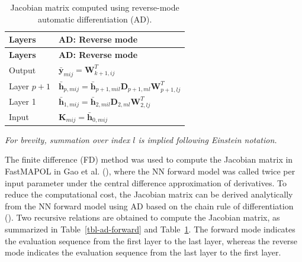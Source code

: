 \documentclass[
  11pt,
  letterpaper,
]{scrreprt}
\begin{document}
\begin{longtable}[]{@{}
  >{\raggedright\arraybackslash}p{}
  >{\raggedright\arraybackslash}p{}@{}}
\caption{Jacobian matrix computed using reverse-mode automatic
differentiation (AD).}\label{tbl-ad-reverse}\tabularnewline
\toprule\noalign{}
\begin{minipage}[b]{\linewidth}\raggedright
\textbf{Layers}
\end{minipage} & \begin{minipage}[b]{\linewidth}\raggedright
\textbf{AD: Reverse mode}
\end{minipage} \\
\midrule\noalign{}
\endfirsthead
\toprule\noalign{}
\begin{minipage}[b]{\linewidth}\raggedright
\textbf{Layers}
\end{minipage} & \begin{minipage}[b]{\linewidth}\raggedright
\textbf{AD: Reverse mode}
\end{minipage} \\
\midrule\noalign{}
\endhead
\bottomrule\noalign{}
\endlastfoot
Output & \(\bar{\mathbf{y}}_{mij}=\mathbf{W}_{k+1,ij}^T\) \\
Layer \(p+1\) &
\(\bar{\mathbf{h}}_{p,mij}=\bar{\mathbf{h}}_{p+1,mil}\mathbf{D}_{p+1,ml}\mathbf{W}_{p+1,lj}^T\) \\
Layer 1 &
\(\bar{\mathbf{h}}_{1,mij}=\bar{\mathbf{h}}_{2,mil}\mathbf{D}_{2,ml}\mathbf{W}_{2,lj}^T\) \\
Input & \(\mathbf{K}_{mij}=\bar{\mathbf{h}}_{0,mij}\) \\
\end{longtable}

\emph{For brevity, summation over index \(l\) is implied following
Einstein notation.}

The finite difference (FD) method was used to compute the Jacobian
matrix in FastMAPOL in Gao et al. (),
where the NN forward model was called twice per input parameter under
the central difference approximation of derivatives. To reduce the
computational cost, the Jacobian matrix can be derived analytically from
the NN forward model using AD based on the chain rule of differentiation
(). Two recursive
relations are obtained to compute the Jacobian matrix, as summarized in
Table~\ref{tbl-ad-forward} and Table~\ref{tbl-ad-reverse}. The forward
mode indicates the evaluation sequence from the first layer to the last
layer, whereas the reverse mode indicates the evaluation sequence from
the last layer to the first layer.
\end{document}
